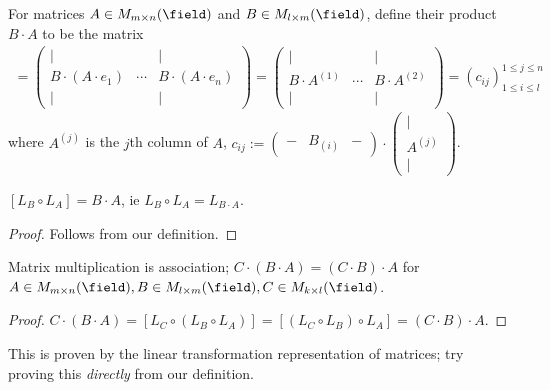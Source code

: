 \begin{definition}
    For matrices $A \in M_{m \times n}(\field)$ and $B \in M_{l \times m}(\field)$, define their product $B \cdot A$ to be the matrix \begin{align*}
        [L_B \circ L_A] =
        \begin{pmatrix}
            \vert &  & \vert\\
            B\cdot (A \cdot e_1) & \cdots & B \cdot (A \cdot e_n)\\
            \vert & & \vert
        \end{pmatrix} = \begin{pmatrix}
            \vert & & \vert\\
            B \cdot A^{(1)} &\cdots & B \cdot A^{(2)}\\
            \vert & & \vert
        \end{pmatrix} = \left(c_{ij}\right)_{1 \leq i \leq l}^{1 \leq j \leq n}
    \end{align*}
    where $A^{(j)}$ is the $j$th column of $A$, $c_{ij} := \begin{pmatrix}
        - & B_{(i)} & - 
    \end{pmatrix} \cdot \begin{pmatrix}
        \vert \\
        A^{(j)}\\
        \vert
    \end{pmatrix}$.
\end{definition}

\begin{proposition}
    $[L_B \circ L_A] = B \cdot A$, ie $L_B \circ L_A = L_{B \cdot A}$.
\end{proposition}
\begin{proof}
    Follows from our definition.
\end{proof}

\begin{corollary}
    Matrix multiplication is association; $C \cdot (B \cdot A) = (C \cdot B) \cdot A$ for $A \in M_{m \times n}(\field), B \in M_{l \times m}(\field), C \in M_{k \times l}(\field)$.
\end{corollary}
\begin{proof}
    $C\cdot (B \cdot A) = [L_C \circ (L_B \circ L_A)] = [(L_C\circ L_B) \circ L_A] = (C \cdot B) \cdot A$.
\end{proof}

\begin{remark}
    This is proven by the linear transformation representation of matrices; try proving this \emph{directly} from our definition.
\end{remark}

